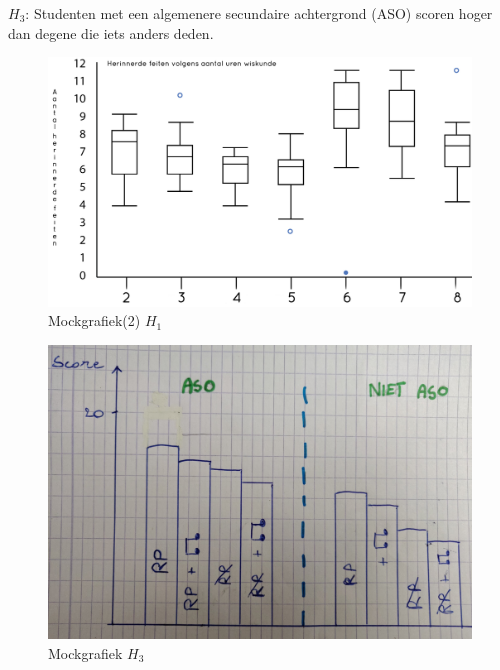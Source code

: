 \documentclass{hogent-article}
\begin{document}
	\textbf{$H_3$}: Studenten met een algemenere secundaire achtergrond (ASO) scoren hoger dan degene die iets anders deden.
	\begin{figure}[H]
		\includegraphics[width=\linewidth]{img/mockboxplot.png}
		\caption{Mockgrafiek(2) \textbf{$H_1$}}
	\end{figure}
	\begin{figure}[H]
		\includegraphics[width=\linewidth]{img/imgg2.jpg}
		\caption{Mockgrafiek \textbf{$H_3$}}
	\end{figure}
	
\end{document}

